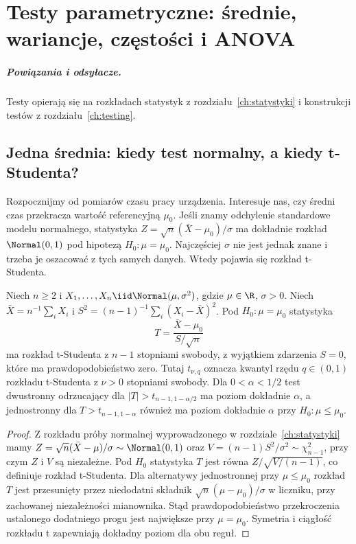 \chapter{Testy parametryczne: średnie, wariancje, częstości i ANOVA}
\label{ch:parametric-tests}
\paragraph{Powiązania i odsyłacze.} Testy opierają się na rozkładach statystyk z rozdziału~\ref{ch:statystyki} i konstrukcji testów z rozdziału~\ref{ch:testing}.


\section{Jedna średnia: kiedy test normalny, a kiedy t-Studenta?}
Rozpocznijmy od pomiarów czasu pracy urządzenia. Interesuje nas,
czy średni czas przekracza wartość referencyjną $\mu_0$.
Jeśli znamy odchylenie standardowe modelu normalnego, statystyka
$Z=\sqrt n(\bar X-\mu_0)/\sigma$ ma dokładnie rozkład
$\Normal(0,1)$ pod hipotezą $H_0:\mu=\mu_0$.
Najczęściej $\sigma$ nie jest jednak znane i trzeba je oszacować
z tych samych danych. Wtedy pojawia się rozkład t-Studenta.

\begin{twierdzenie}
\label{thm:one-sample-t}
Niech $n\ge2$ i $X_1,\ldots,X_n\iid\Normal(\mu,\sigma^2)$,
gdzie $\mu\in\R$, $\sigma>0$. Niech
$\bar X=n^{-1}\sum_iX_i$ i
$S^2=(n-1)^{-1}\sum_i(X_i-\bar X)^2$.
Pod $H_0:\mu=\mu_0$ statystyka
\[
 T=\frac{\bar X-\mu_0}{S/\sqrt n}
\]
ma rozkład t-Studenta z $n-1$ stopniami swobody, z wyjątkiem
zdarzenia $S=0$, które ma prawdopodobieństwo zero.
Tutaj $t_{\nu,q}$ oznacza kwantyl rzędu $q\in(0,1)$
rozkładu t-Studenta z $\nu>0$ stopniami swobody.
Dla $0<\alpha<1/2$ test dwustronny odrzucający dla
$|T|>t_{n-1,1-\alpha/2}$ ma poziom dokładnie $\alpha$,
a jednostronny dla $T>t_{n-1,1-\alpha}$ również ma
poziom dokładnie $\alpha$ przy $H_0:\mu\le\mu_0$.
\end{twierdzenie}
\begin{proof}
Z rozkładu próby normalnej wyprowadzonego w
rozdziale~\ref{ch:statystyki} mamy
$Z=\sqrt n(\bar X-\mu)/\sigma\sim\Normal(0,1)$ oraz
$V=(n-1)S^2/\sigma^2\sim\chi^2_{n-1}$, przy czym
$Z$ i $V$ są niezależne. Pod $H_0$ statystyka $T$ jest
równa $Z/\sqrt{V/(n-1)}$, co definiuje rozkład t-Studenta.
Dla alternatywy jednostronnej przy $\mu\le\mu_0$
rozkład $T$ jest przesunięty przez niedodatni składnik
$\sqrt n(\mu-\mu_0)/\sigma$ w liczniku, przy zachowanej
niezależności mianownika. Stąd prawdopodobieństwo przekroczenia
ustalonego dodatniego progu jest największe przy $\mu=\mu_0$.
Symetria i ciągłość rozkładu t zapewniają dokładny poziom
dla obu reguł.
\end{proof}

